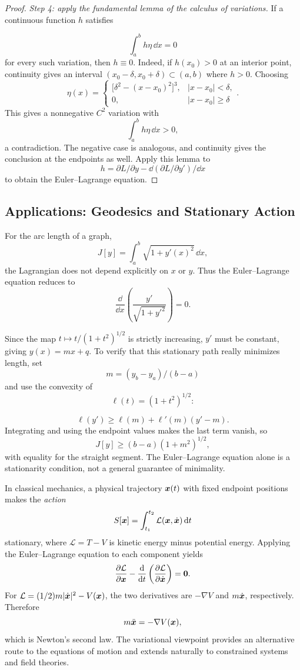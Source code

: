 \begin{proof}
\textit{Step 4: apply the fundamental lemma of the calculus of variations.} If a continuous function $h$ satisfies

\[
\int_a^b h\eta\,\dd x=0
\]
for every such variation, then $h\equiv0$. Indeed, if $h(x_0)>0$ at an interior point, continuity gives an interval $(x_0-\delta,x_0+\delta)\subset(a,b)$ where $h>0$. Choosing
\[
\eta(x)=
\begin{cases}
\big[\delta^2-(x-x_0)^2\big]^3,& |x-x_0|<\delta,\\
0,& |x-x_0|\geq\delta
\end{cases}.
\]
This gives a nonnegative $C^2$ variation with
\[
\int_a^b h\eta\,\dd x>0,
\]
a contradiction. The negative case is analogous, and continuity gives the conclusion at the endpoints as well. Apply this lemma to
\[
h=\partial L/\partial y-\dd(\partial L/\partial y')/\dd x
\]
to obtain the Euler--Lagrange equation.
\end{proof}

\subsection{Applications: Geodesics and Stationary Action}

\begin{example}
For the arc length of a graph, \[
J[y]=\int_a^b\sqrt{1+y'(x)^2}\,\dd x,
\] the Lagrangian does not depend explicitly on $x$ or $y$. Thus the Euler--Lagrange equation reduces to
\[
\frac{\dd}{\dd x}\left(\frac{y'}{\sqrt{1+y'^2}}\right)=0.
\]

Since the map $t\mapsto t/(1+t^2)^{1/2}$ is strictly increasing, $y'$ must be constant, giving $y(x)=mx+q$. To verify that this stationary path really minimizes length, set
\[
m=(y_b-y_a)/(b-a)
\]
and use the convexity of
\[
\ell(t)=(1+t^2)^{1/2}:
\]

\[
\ell(y')\geq\ell(m)+\ell'(m)(y'-m).
\]
Integrating and using the endpoint values makes the last term vanish, so
\[
J[y]\geq(b-a)(1+m^2)^{1/2},
\]
with equality for the straight segment. The Euler--Lagrange equation alone is a stationarity condition, not a general guarantee of minimality.
\end{example}

\begin{example}
In classical mechanics, a physical trajectory $\bm{x}(t)$ with fixed endpoint positions makes the \emph{action} \[
S[\bm{x}]=\int_{t_1}^{t_2}\mathcal{L}(\bm{x},\dot{\bm{x}})\,\mathrm{d} t
\] stationary, where $\mathcal{L}=T-V$ is kinetic energy minus potential energy. Applying the Euler--Lagrange equation to each component yields
\[
\frac{\partial\mathcal{L}}{\partial\bm{x}}
-\frac{\mathrm{d}}{\mathrm{d} t}\left(\frac{\partial\mathcal{L}}{\partial\dot{\bm{x}}}\right)=\mathbf{0}.
\]
For $\mathcal{L}=(1/2)m|\dot{\bm{x}}|^2-V(\bm{x})$, the two derivatives are $-\nabla V$ and $m\dot{\bm{x}}$, respectively. Therefore
\begin{equation}
m\ddot{\bm{x}}=-\nabla V(\bm{x}),
\end{equation}
which is Newton's second law. The variational viewpoint provides an alternative route to the equations of motion and extends naturally to constrained systems and field theories.
\end{example}